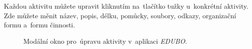 \documentclass[male,czech,api_bc]{kitheses}
\begin{document}
Každou aktivitu můžete upravit kliknutím na~tlačítko tužky u~konkrétní aktivity. Zde můžete měnit název, popis, délku, pomůcky, soubory, odkazy, organizační formu a~formu činnosti.

\begin{figure}[H]
	\centering
	\caption{Modální okno pro~úpravu aktivity v~aplikaci \textit{EDUBO}.}
	\label{fig:manual-2}
\end{figure}

\newpage
\end{document}
